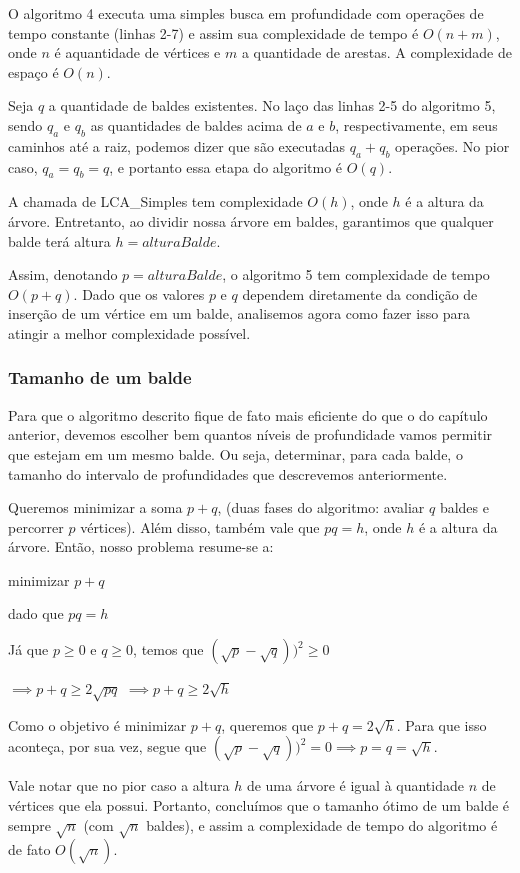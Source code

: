 O algoritmo 4 executa uma simples busca em profundidade com operações de tempo constante (linhas 2-7) e assim sua complexidade de tempo é $O(n+m)$, onde $n$ é aquantidade de vértices e $m$ a quantidade de arestas. A complexidade de espaço é $O(n)$.

Seja $q$ a quantidade de baldes existentes. No laço das linhas 2-5 do algoritmo 5, sendo $q_a$ e $q_b$ as quantidades de baldes acima de $a$ e $b$, respectivamente, em seus caminhos até a raiz, podemos dizer que são executadas $q_a + q_b$ operações. No pior caso, $q_a = q_b = q$, e portanto essa etapa do algoritmo é $O(q)$.

A chamada de LCA\_Simples tem complexidade $O(h)$, onde $h$ é a altura da árvore. Entretanto, ao dividir nossa árvore em baldes, garantimos que qualquer balde terá altura $h = alturaBalde$.

Assim, denotando $p = alturaBalde$, o algoritmo 5 tem complexidade de tempo $O(p + q)$. Dado que os valores $p$ e $q$ dependem diretamente da condição de inserção de um vértice em um balde, analisemos agora como fazer isso para atingir a melhor complexidade possível.

\vspace{1.4cm}

\subsubsection{Tamanho de um balde}

Para que o algoritmo descrito fique de fato mais eficiente do que o do capítulo anterior, devemos escolher bem quantos níveis de profundidade vamos permitir que estejam em um mesmo balde. Ou seja, determinar, para cada balde, o tamanho do intervalo de profundidades que descrevemos anteriormente.

Queremos minimizar a soma $p + q$, (duas fases do algoritmo: avaliar $q$ baldes e percorrer $p$ vértices). Além disso, também vale que $pq = h$, onde $h$ é a altura da árvore. Então, nosso problema resume-se a:

\centerline{minimizar $p + q$}
\centerline{dado que $pq = h$}

\hspace{1cm}

Já que $p \geq 0$ e $q \geq 0$, temos que $(\sqrt{p} - \sqrt{q}))^2 \geq 0$

$\implies p + q \geq 2\sqrt{pq}$
$\implies p + q \geq 2\sqrt{h}$

\hspace{1cm}

Como o objetivo é minimizar $p + q$, queremos que $p + q = 2\sqrt{h}$. Para que isso aconteça, por sua vez, segue que $(\sqrt{p} - \sqrt{q}))^2 = 0 \implies p = q = \sqrt{h}$.

\hspace{1cm}

Vale notar que no pior caso a altura $h$ de uma árvore é igual à quantidade $n$ de vértices que ela possui. Portanto, concluímos que o tamanho ótimo de um balde é sempre $\sqrt{n}$ (com $\sqrt{n}$ baldes), e assim a complexidade de tempo do algoritmo é de fato $O(\sqrt{n})$.

